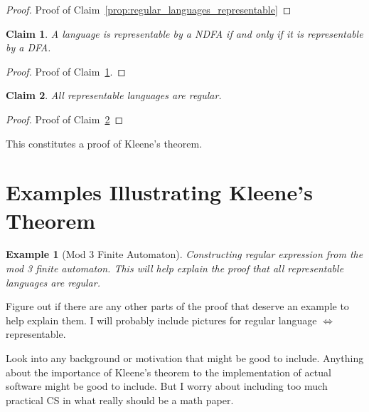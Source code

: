 \documentclass[12 pt, twoside, letterpaper]{article}
\newcommand{\meo}[1]{#1}
\newcommand{\refprop}[1]{Claim~\ref{#1}}
\theoremstyle{definition}
\theoremstyle{remark}
\theoremstyle{plain}
\newtheorem*{example}{Example}
\newtheorem{claim}{Claim}
\begin{document}
	\begin{proof}
		Proof of \refprop{prop:regular_languages_representable}
	\end{proof}

	\begin{claim}
	\label{prop:ndfa_dfa_equivalent}
		A language is representable by a NDFA if and only if it is representable by a DFA.
	\end{claim}

	\begin{proof}
	\label{proof:ndfa_dfa_equivalent}
		Proof of \refprop{prop:ndfa_dfa_equivalent}.
	\end{proof}

	\begin{claim}
	\label{prop:representable_languages_regular}
		All representable languages are regular.
	\end{claim}

	\begin{proof}
		Proof of \refprop{prop:representable_languages_regular}
	\end{proof}
	

	This constitutes a proof of Kleene's theorem.



\section{Examples Illustrating Kleene's Theorem} %
\label{sec:examples}

	\begin{example}[Mod 3 Finite Automaton]
		Constructing regular expression from the mod 3 finite automaton.
		This will help explain the proof that all representable languages are regular.
	\end{example}

	\meo{
		Figure out if there are any other parts of the proof that deserve an example to help explain them.
		I will probably include pictures for regular language $\iff$ representable.
	}

\meo{

	Look into any background or motivation that might be good to include.
	Anything about the importance of Kleene's theorem to the implementation of actual software might be good to include.
	But I worry about including too much practical CS in what really should be a math paper.
}
\end{document}
